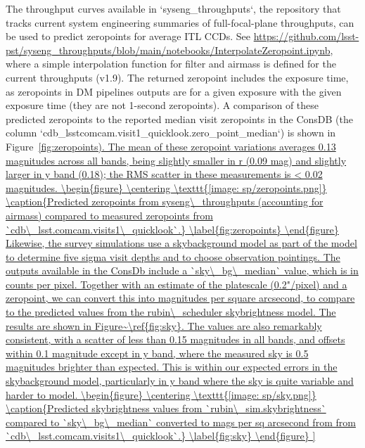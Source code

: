 The throughput curves available in `syseng\_throughputs`, the repository that tracks current system engineering summaries of full-focal-plane throughputs, can be used to predict zeropoints for average ITL CCDs. See \url{https://github.com/lsst-pst/syseng_throughputs/blob/main/notebooks/InterpolateZeropoint.ipynb}, where a simple interpolation function for filter and airmass is defined for the current throughputs (v1.9). The returned zeropoint includes the exposure time, as zeropoints in DM pipelines outputs are for a given exposure with the given exposure time (they are not 1-second zeropoints). A comparison of these predicted zeropoints to the reported median visit zeropoints in the ConsDB (the column `cdb\_lsstcomcam.visit1\_quicklook.zero\_point\_median`) is shown in Figure~\ref{fig:zeropoints). The mean of these zeropoint variations averages 0.13 magnitudes across all bands, being slightly smaller in r (0.09 mag) and slightly larger in y band (0.18); the RMS scatter in these measurements is < 0.02 magnitudes. 

\begin{figure}
    \centering
    \texttt{[image: sp/zeropoints.png]}
    \caption{Predicted zeropoints from syseng\_throughputs (accounting for airmass) compared to measured zeropoints from `cdb\_lsst.comcam.visits1\_quicklook`.}
    \label{fig:zeropoints}
    \end{figure}
    
    
Likewise, the survey simulations use a skybackground model as part of the model to determine five sigma visit depths and to choose observation pointings. The outputs available in the ConsDb include a `sky\_bg\_median` value, which is in counts per pixel. Together with an estimate of the platescale (0.2"/pixel) and a zeropoint, we can convert this into magnitudes per square arcsecond, to compare to the predicted values from the rubin\_scheduler skybrightness model. The results are shown in Figure~\ref{fig:sky}.  The values are also remarkably consistent, with a scatter of less than 0.15 magnitudes in all bands, and offsets within 0.1 magnitude except in y band, where the measured sky is 0.5 magnitudes brighter than expected. This is  within our expected errors in the skybackground model, particularly in y band where the sky is quite variable and harder to model. 

\begin{figure}
    \centering
    \texttt{[image: sp/sky.png]}
    \caption{Predicted skybrightness values from `rubin\_sim.skybrightness`  compared to `sky\_bg\_median` converted to mags per sq arcsecond  from  from `cdb\_lsst.comcam.visits1\_quicklook`.}
    \label{fig:sky}
    \end{figure}
    
}
